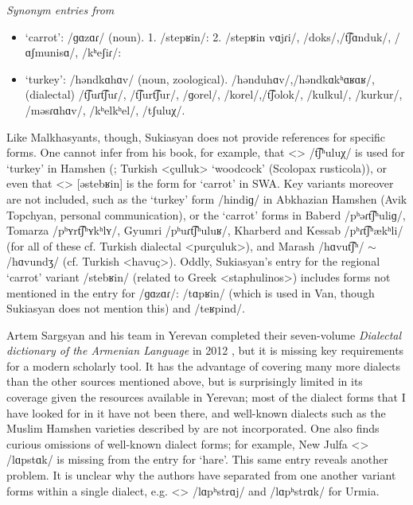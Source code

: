 \documentclass[output=paper]{langscibook}
\begin{document}
\begin{exe}
    \ex \textit{Synonym entries from \citet{Sukiasyan-1965-Synonymdictionary}} \label{vaux:ex:synonym}

    \begin{itemize}
        \item   `carrot':   /ɡɑzɑɾ/ (noun). 1. /stepʁin/: 2. /stepʁin vɑjɾi/, /doks/,\newline /t͡ʃɑnduk/, /ɑʃmunisɑ/, /kʰeʃiɾ/:
	
	\item	`turkey': /həndkɑhɑv/ (noun, zoological).  /hənduhɑv/,\newline  /həndkɑkʰɑʁɑʁ/, (dialectal) /t͡ʃuɾt͡ʃuɾ/, /t͡ʃurt͡ʃur/, /ɡorel/, /korel/,\newline  /t͡ʃolok/, /kulkul/, /kurkur/, /məsɾɑhɑv/, /kʰelkʰel/, /tʃuluχ/.
    \end{itemize}
\end{exe}




Like Malkhasyants, though, Sukiasyan does not provide references for specific forms. One cannot infer from his book, for example, that <> /t͡ʃʰuluχ/ is used for `turkey' in Hamshen (\citealt[262]{Adjarian-1947-HamshenDialect};  Turkish <çulluk> `woodcock' (Scolopax rusticola)), or even that <> [əstebʁin] is the form for `carrot' in SWA. Key variants moreover are not included, such as the `turkey' form /hindiɡ/ in Abkhazian Hamshen (Avik Topchyan, personal communication), or the `carrot' forms in Baberd /pʰəɾt͡ʃʰuliɡ/, Tomarza /pʰʏrt͡ʃʰʏkʰlʏ/, Gyumri /pʰuɾt͡ʃʰuluʁ/, Kharberd and Kessab /pʰɾt͡ʃʰækʰli/ (for all of these cf. Turkish dialectal <purçuluk>), and Marash /hɑvut͡ʃʰ/ $\sim$ /hɑvundʒ/ (cf. Turkish <havuç>). Oddly, Sukiasyan's entry for the regional `carrot' variant /stebʁin/ (related to Greek <staphulinos>) includes forms not mentioned in the entry for /ɡɑzɑɾ/: /tɑpʁin/ (which is used in Van, though Sukiasyan does not mention this) and /teʁpind/.

Artem Sargsyan and his team in Yerevan completed their seven-volume \textit{Dialectal dictionary of the Armenian Language} in 2012 \citep{Sargsyan-2012-DialectalDictionary}, but it is missing key requirements for a modern scholarly tool. It has the advantage of covering many more dialects than the other sources mentioned above, but is surprisingly limited in its coverage given the resources available in Yerevan; most of the dialect forms that I have looked for in it have not been there, and well-known dialects such as the Muslim Hamshen varieties described by \citet{Dumezil-1964-NotesparlerarménienmusulmanHemşin} are not incorporated. One also finds curious omissions of well-known dialect forms; for example,  New Julfa <> /lɑpstɑk/ is missing from the entry for `hare'. This same entry reveals another problem. It is unclear why the authors have separated from one another variant forms within a single dialect, e.g. <> /lɑpʰstrɑj/ and  /lɑpʰstrɑk/ for Urmia. 
\end{document}
